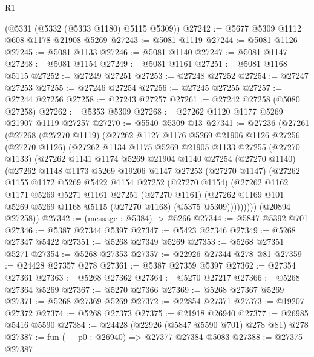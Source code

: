 \begin{lexlean}{R1}
\begin{coremodule}
    (@5331 (@5332 (@5333 @1180) @5115 @5309))
@27242 := @5677 @5309 @1112 @608 @1178 @21908 @5269
@27243 := @5081 @1119
@27244 := @5081 @1126
@27245 := @5081 @1133
@27246 := @5081 @1140
@27247 := @5081 @1147
@27248 := @5081 @1154
@27249 := @5081 @1161
@27251 := @5081 @1168 @5115
@27252 := @27249 @27251
@27253 := @27248 @27252
@27254 := @27247 @27253
@27255 := @27246 @27254
@27256 := @27245 @27255
@27257 := @27244 @27256
@27258 := @27243 @27257
@27261 := @27242 @27258 (@5080 @27258)
@27262 := @5353 @5309
@27268 := @27262 @1120 @1177 @5269 @21907 @1119 @27257
@27270 := @5540 @5309 @13
@27341 := @27236
    (@27261
      (@27268
        (@27270 @1119)
        (@27262
          @1127
          @1176
          @5269
          @21906
          @1126
          @27256
          (@27270 @1126)
          (@27262
            @1134
            @1175
            @5269
            @21905
            @1133
            @27255
            (@27270 @1133)
            (@27262
              @1141
              @1174
              @5269
              @21904
              @1140
              @27254
              (@27270 @1140)
              (@27262
                @1148
                @1173
                @5269
                @19206
                @1147
                @27253
                (@27270 @1147)
                (@27262
                  @1155
                  @1172
                  @5269
                  @5422
                  @1154
                  @27252
                  (@27270 @1154)
                  (@27262
                    @1162
                    @1171
                    @5269
                    @5271
                    @1161
                    @27251
                    (@27270 @1161)
                    (@27262 @1169 @101 @5269 @5269 @1168 @5115 (@27270 @1168) (@5375 @5309)))))))))
      (@20894 @27258))
@27342 := (message : @5384) -> @5266
@27344 := @5847 @5392 @701
@27346 := @5387 @27344 @5397
@27347 := @5423 @27346
@27349 := @5268 @27347 @5422
@27351 := @5268 @27349 @5269
@27353 := @5268 @27351 @5271
@27354 := @5268 @27353
@27357 := @22926 @27344 @278 @81
@27359 := @24428 @27357 @278
@27361 := @5387 @27359 @5397
@27362 := @27354 @27361
@27363 := @5268 @27362
@27364 := @5270 @27217
@27366 := @5268 @27364 @5269
@27367 := @5270 @27366
@27369 := @5268 @27367 @5269
@27371 := @5268 @27369 @5269
@27372 := @22854 @27371
@27373 := @19207 @27372
@27374 := @5268 @27373
@27375 := @21918 @26940
@27377 := @26985 @5416 @5590
@27384 := @24428 (@22926 (@5847 @5590 @701) @278 @81) @278
@27387 := fun (__p0 : @26940) => @27377 @27384 @5083
@27388 := @27375 @27387

\end{coremodule}
\end{lexlean}
